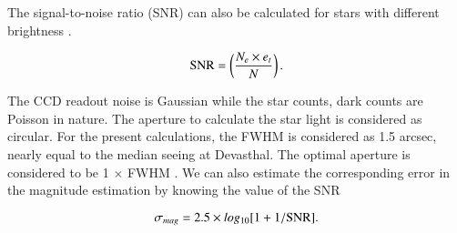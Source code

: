 \documentclass[useAMS,usenatbib]{mnras}
\begin{document}
The signal-to-noise ratio (SNR) can also be calculated for stars with different brightness 
\citep{1989ecaa.book.....M}. 

\begin{equation}
{\rm SNR} = \left( \frac {{N_e \times e_t}}{N}\right). 
\end{equation}

The CCD readout noise is Gaussian while the star counts, dark counts are Poisson in nature. 
The aperture to calculate the star light is considered as circular. For the present calculations, 
the FWHM is considered as 1.5 arcsec, nearly equal to the median seeing at Devasthal.
The optimal aperture is considered to be 1 $\times$ FWHM \citep[see][]{1989PASP..101..616H,Howell}.
We can also estimate the corresponding error in the magnitude estimation by knowing 
the value of the SNR \citep{2011A&A...531A.151D} 

\begin{equation}
\sigma_{mag} = 2.5 \times log_{10}[1+1/{\rm SNR}].
\end{equation}
\end{document}
